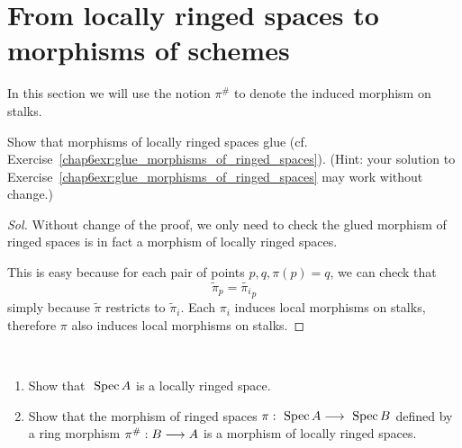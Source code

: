 \documentclass[11pt]{book} %
\begin{document}
\section{From locally ringed spaces to morphisms of schemes}
In this section we will use the notion $\pi^\#$ to denote the induced morphism on stalks.
\begin{exr}
Show that morphisms of locally ringed spaces glue (cf. Exercise~\ref{chap6exr:glue_morphisms_of_ringed_spaces}). (Hint: your solution to Exercise~\ref{chap6exr:glue_morphisms_of_ringed_spaces} may work without change.)
\end{exr}
\begin{proof}[Sol]
Without change of the proof, we only need to check the glued morphism of ringed spaces is in fact a morphism of locally ringed spaces.

This is easy because for each pair of points $p,q,\pi(p)=q$, we can check that
$$
\tilde{\pi}_{p}=\tilde{\pi_i}_{p}
$$
simply because $\tilde{\pi}$ restricts to $\tilde{\pi}_i$. Each $\pi_i$ induces local morphisms on stalks, therefore $\pi$ also induces local morphisms on stalks.
\end{proof}
\begin{exr}
\ \begin{enumerate}[label=(\alph*)]
\item Show that $\text{ Spec\,} A$ is a locally ringed space.
\item Show that the morphism of ringed spaces $\pi:\text{ Spec\,} A\longrightarrow \text{ Spec\,} B$ defined by a ring morphism $\pi^\#:B\longrightarrow A$ is a morphism of locally ringed spaces.
\end{enumerate}
\end{exr}
\end{document}
